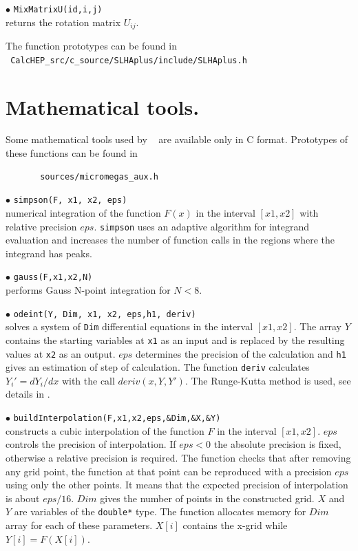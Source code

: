 \documentclass[12pt,a4paper]{article}
\begin{document}
\noindent
$\bullet$ \verb|MixMatrixU(id,i,j)|\\
returns the rotation matrix $U_{ij}$.

The function prototypes can be found in \\
\noindent
\verb| CalcHEP_src/c_source/SLHAplus/include/SLHAplus.h|

\section {Mathematical tools.}

Some mathematical tools used by \micro~ are available only 
in C format. Prototypes of these functions can be found in
\begin{verbatim}
       sources/micromegas_aux.h 
\end{verbatim}

\noindent$\bullet$ \verb|simpson(F, x1, x2, eps)|\\
numerical integration of the function $F(x)$ in the interval $[x1,x2]$  
with relative precision $eps$. \verb|simpson| uses an adaptive algorithm 
for integrand evaluation and increases the number of function calls in 
the regions where the  integrand has peaks. 

\noindent$\bullet$ \verb|gauss(F,x1,x2,N)|\\
performs Gauss N-point integration for $N<8$.  

\noindent$\bullet$ \verb|odeint(Y, Dim, x1, x2, eps,h1, deriv)|\\
solves a  system of \verb|Dim| differential  equations in the interval 
$[x1,x2]$. The array $Y$ contains the starting variables at \verb|x1| as an input and is replaced by the
resulting values at \verb|x2| as an output. $eps$ determines the precision of the 
calculation and  \verb|h1| gives an estimation of step of calculation.  
The function \verb|deriv| calculates 
$Y_i' = dY_i/dx$ with the call $deriv(x,Y,Y')$. The Runge-Kutta method is
used, see details in \cite{Numerical}.  

\noindent$\bullet$ \verb|buildInterpolation(F,x1,x2,eps,&Dim,&X,&Y)|\\
constructs  a cubic interpolation of the function $F$ in the interval $[x1,x2]$.
$eps$ controls the precision of interpolation. If $eps < 0$ the absolute 
precision is fixed, otherwise a relative precision is required. 
The function checks that after removing any grid point, the function at that point
can be reproduced with a precision $eps$ using only the other points.  It means that
the expected precision of interpolation is about $eps/16$. $Dim$ gives the number 
of points in the  constructed grid. $X$ and $Y$ are variables of the  
\verb|double*| type. The function allocates memory for $Dim$ array for each 
 of these parameters. $X[i]$ contains the x-grid while $Y[i]=F(X[i])$.
\end{document}
